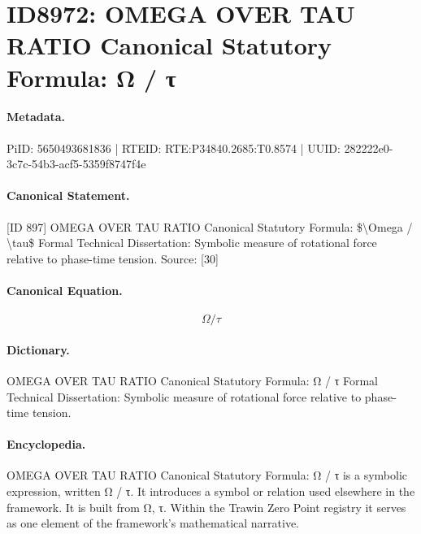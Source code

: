 \section*{ID8972: OMEGA OVER TAU RATIO Canonical Statutory Formula: Ω / τ}
\paragraph{Metadata.}
PiID: 5650493681836 | RTEID: RTE:P34840.2685:T0.8574 | UUID: 282222e0-3c7c-54b3-acf5-5359f8747f4e

\paragraph{Canonical Statement.}
[ID 897] OMEGA OVER TAU RATIO Canonical Statutory Formula: \$\textbackslash{}Omega / \textbackslash{}tau\$ Formal Technical Dissertation: Symbolic measure of rotational force relative to phase-time tension. Source: [30]

\paragraph{Canonical Equation.}
\[
\Omega / \tau
\]

\paragraph{Dictionary.}
OMEGA OVER TAU RATIO Canonical Statutory Formula: Ω / τ Formal Technical Dissertation: Symbolic measure of rotational force relative to phase-time tension.

\paragraph{Encyclopedia.}
OMEGA OVER TAU RATIO Canonical Statutory Formula: Ω / τ is a symbolic expression, written Ω / τ. It introduces a symbol or relation used elsewhere in the framework. It is built from Ω, τ. Within the Trawin Zero Point registry it serves as one element of the framework's mathematical narrative.
